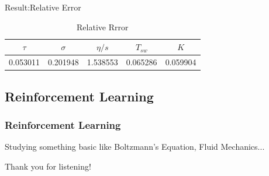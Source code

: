 \documentclass{beamer}
\begin{document}
\begin{frame}{Result:Relative Error}
\begin{table}[htbp]
    \centering
    \caption{Relative Rrror}
      \begin{tabular}{c|c|c|c|c}\toprule
      $\tau$ & $\sigma$ & $\eta/s$ & $T_{sw}$ & $K$ \\\midrule
      0.053011 & 0.201948 & 1.538553 & 0.065286 & 0.059904 \\\bottomrule
      \end{tabular}%
    \label{tab:addlabel}%
  \end{table}%
  
\end{frame}
\begin{frame}
    \section{Reinforcement Learning}
    \frametitle{Reinforcement Learning}
    Studying something basic like Boltzmann's Equation, Fluid Mechanics...


\end{frame}
\begin{frame}
    Thank you for listening!
\end{frame}
\end{document}
